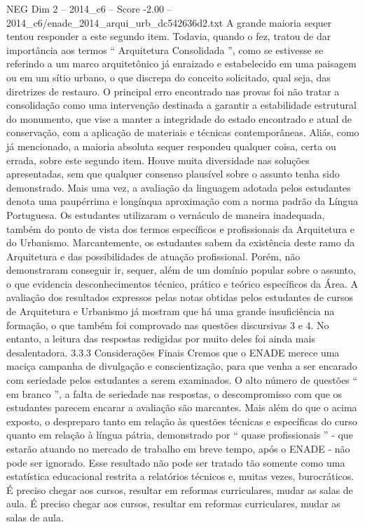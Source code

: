 \begin{textsample}{NEG Dim 2 – 2014\_c6 – Score -2.00 – 2014\_c6/enade\_2014\_arqui\_urb\_dc542636d2.txt}
A grande maioria sequer tentou responder a este segundo item.
Todavia, quando o fez, tratou de dar importância aos termos “ Arquitetura Consolidada ”, como se estivesse se referindo a um marco arquitetônico já enraizado e estabelecido em uma paisagem ou em um sítio urbano, o que discrepa do conceito solicitado, qual seja, das diretrizes de restauro.
O principal erro encontrado nas provas foi não tratar a consolidação como uma intervenção destinada a garantir a estabilidade estrutural do monumento, que vise a manter a integridade do estado encontrado e atual de conservação, com a aplicação de materiais e técnicas contemporâneas.
Aliás, como já mencionado, a maioria absoluta sequer respondeu qualquer coisa, certa ou errada, sobre este segundo item.
Houve muita diversidade nas soluções apresentadas, sem que qualquer consenso plausível sobre o assunto tenha sido demonstrado.
Mais uma vez, a avaliação da linguagem adotada pelos estudantes denota uma paupérrima e longínqua aproximação com a norma padrão da Língua Portuguesa.
Os estudantes utilizaram o vernáculo de maneira inadequada, também do ponto de vista dos termos específicos e profissionais da Arquitetura e do Urbanismo.
Marcantemente, os estudantes sabem da existência deste ramo da Arquitetura e das possibilidades de atuação profissional.
Porém, não demonstraram conseguir ir, sequer, além de um domínio popular sobre o assunto, o que evidencia desconhecimentos técnico, prático e teórico específicos da Área.
A avaliação dos resultados expressos pelas notas obtidas pelos estudantes de cursos de Arquitetura e Urbanismo já mostram que há uma grande insuficiência na formação, o que também foi comprovado nas questões discursivas 3 e 4.
No entanto, a leitura das respostas redigidas por muito deles foi ainda mais desalentadora. 3.3.3 Considerações Finais Cremos que o ENADE merece uma maciça campanha de divulgação e conscientização, para que venha a ser encarado com seriedade pelos estudantes a serem examinados.
O alto número de questões “ em branco ”, a falta de seriedade nas respostas, o descompromisso com que os estudantes parecem encarar a avaliação são marcantes.
Mais além do que o acima exposto, o despreparo tanto em relação às questões técnicas e específicas do curso quanto em relação à língua pátria, demonstrado por “ quase profissionais ” - que estarão atuando no mercado de trabalho em breve tempo, após o ENADE - não pode ser ignorado.
Esse resultado não pode ser tratado tão somente como uma estatística educacional restrita a relatórios técnicos e, muitas vezes, burocráticos.
É preciso chegar aos cursos, resultar em reformas curriculares, mudar as salas de aula.
É preciso chegar aos cursos, resultar em reformas curriculares, mudar as salas de aula.

\end{textsample}
